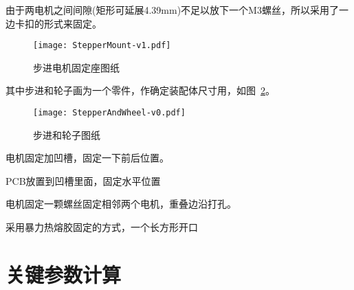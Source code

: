 由于两电机之间间隙(矩形可延展4.39mm)不足以放下一个M3螺丝，所以采用了一边卡扣的形式来固定。

\begin{figure}[htbp]
    \centering
    \texttt{[image: StepperMount-v1.pdf]}
    \caption{步进电机固定座图纸}
    \label{fig:StepperMount-v1-Datasheet}
\end{figure}

其中步进和轮子画为一个零件，作确定装配体尺寸用，如图~\ref{fig:StepperAndWheel-v0-Datasheet}。

\begin{figure}[htbp]
    \centering
    \texttt{[image: StepperAndWheel-v0.pdf]}
    \caption{步进和轮子图纸}
    \label{fig:StepperAndWheel-v0-Datasheet}
\end{figure}


电机固定加凹槽，固定一下前后位置。

PCB放置到凹槽里面，固定水平位置

电机固定一颗螺丝固定相邻两个电机，重叠边沿打孔。

采用暴力热熔胶固定的方式，一个长方形开口


\section{关键参数计算}

